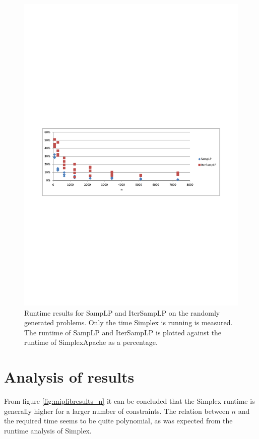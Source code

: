 \documentclass[nocopyrightspace]{acm_proc_article-sp}
\begin{document}
\begin{figure}[h!]
\includegraphics[width=\columnwidth]{../Results/simplexruntime_relative_simplex.pdf}
\caption{Runtime results for SampLP and IterSampLP on the randomly generated problems. Only the time Simplex is running is measured. The runtime of SampLP and IterSampLP is plotted against the runtime of SimplexApache as a percentage.}
\label{fig:simplexruntime_relative_simplex}
\end{figure}
\vfill
\section{Analysis of results}
From figure \ref{fig:miplibresults_n} it can be concluded that the Simplex runtime is generally higher for a larger number of constraints. The relation between $n$ and the required time seems to be quite polynomial, as was expected from the runtime analysis of Simplex. 
\end{document}
